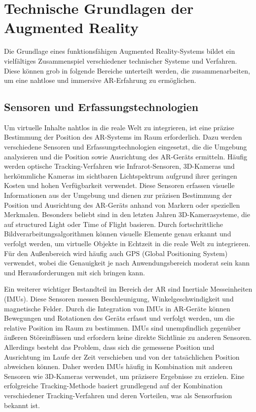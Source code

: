\section{Technische Grundlagen der Augmented Reality}

Die Grundlage eines funktionsfähigen Augmented Reality-Systems bildet ein
vielfältiges Zusammenspiel verschiedener technischer Systeme und Verfahren.
Diese können grob in folgende Bereiche unterteilt werden, die zusammenarbeiten,
um eine nahtlose und immersive AR-Erfahrung zu ermöglichen.

\subsection{Sensoren und Erfassungstechnologien}

Um virtuelle Inhalte nahtlos in die reale Welt zu integrieren, ist eine präzise
Bestimmung der Position des AR-Systems im Raum erforderlich. Dazu werden
verschiedene Sensoren und Erfassungstechnologien eingesetzt, die die Umgebung
analysieren und die Position sowie Ausrichtung des AR-Geräts ermitteln. Häufig
werden optische Tracking-Verfahren wie Infrarot-Sensoren, 3D-Kameras und
herkömmliche Kameras im sichtbaren Lichtspektrum aufgrund ihrer geringen Kosten
und hohen Verfügbarkeit verwendet. Diese Sensoren erfassen visuelle
Informationen aus der Umgebung und dienen zur präzisen Bestimmung der Position
und Ausrichtung des AR-Geräts anhand von Markern oder speziellen Merkmalen.
Besonders beliebt sind in den letzten Jahren 3D-Kamerasysteme, die auf
structured Light oder Time of Flight basieren. Durch fortschrittliche
Bildverarbeitungsalgorithmen können visuelle Elemente genau erkannt und
verfolgt werden, um virtuelle Objekte in Echtzeit in die reale Welt zu
integrieren. Für den Außenbereich wird häufig auch GPS (Global Positioning
System) verwendet, wobei die Genauigkeit je nach Anwendungsbereich moderat sein
kann und Herausforderungen mit sich bringen kann.

Ein weiterer wichtiger Bestandteil im Bereich der AR sind Inertiale
Messeinheiten (IMUs). Diese Sensoren messen Beschleunigung,
Winkelgeschwindigkeit und magnetische Felder. Durch die Integration von IMUs in
AR-Geräte können Bewegungen und Rotationen des Geräts erfasst und verfolgt
werden, um die relative Position im Raum zu bestimmen. IMUs sind unempfindlich
gegenüber äußeren Störeinflüssen und erfordern keine direkte Sichtlinie zu
anderen Sensoren. Allerdings besteht das Problem, dass sich die gemessene
Position und Ausrichtung im Laufe der Zeit verschieben und von der
tatsächlichen Position abweichen können. Daher werden IMUs häufig in
Kombination mit anderen Sensoren wie 3D-Kameras verwendet, um präzisere
Ergebnisse zu erzielen. Eine erfolgreiche Tracking-Methode basiert grundlegend
auf der Kombination verschiedener Tracking-Verfahren und deren Vorteilen, was
als Sensorfusion bekannt ist. \cite{billinghurst2015survey}
